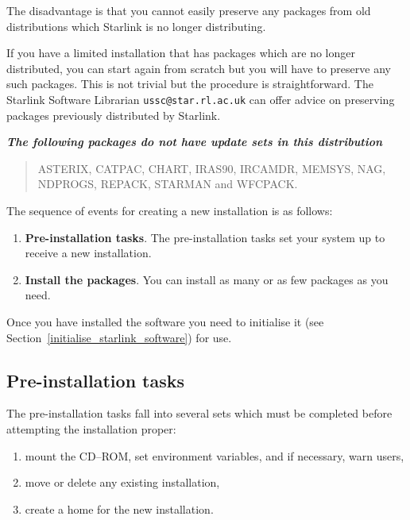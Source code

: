 \documentclass[twoside,11pt]{article}
\newcommand{\htmlref}[2]{#1}
\newcommand{\latex}[1]{#1}
\newcommand{\xlabel}[1]{}
\renewcommand{\_}{\texttt{\symbol{95}}}
\newcommand{\cdrom}{CD--ROM}
\newcommand{\cdrom}{CD-ROM}
\begin{document}
The disadvantage is that you cannot easily preserve any packages from old
distributions which Starlink is no longer distributing.

If you have a limited installation that has packages which are 
no longer distributed, you can start again from scratch but you will
have to preserve any such packages.  This is not trivial but the
procedure is straightforward.
The Starlink Software Librarian \texttt{ussc@star.rl.ac.uk} can offer
advice on preserving packages previously distributed by Starlink.  

\textit{\textbf{The following packages do not have update sets in this
distribution}}

\begin{quote}
ASTERIX, CATPAC, CHART, IRAS90, IRCAMDR, MEMSYS,
NAG, NDPROGS, REPACK, STARMAN and WFCPACK.
\end{quote}

The sequence of events for creating a new installation is as follows:

\begin{enumerate}

\item \textbf{Pre-installation tasks}.  The pre-installation tasks set your
system up to receive a new installation.

\item \textbf{Install the packages}.  You can install as many or as few 
packages as you need.

\end{enumerate}

Once you have installed the software you need to
\htmlref{initialise}{initialise_starlink_software} it \latex{(see
Section~\ref{initialise_starlink_software})} for use.

\subsection{\xlabel{pre-installation_tasks}Pre-installation tasks}
\label{pre-installation_tasks}

The pre-installation tasks fall into several sets which must be completed
before attempting the installation proper:

\begin{enumerate}

\item mount the \cdrom, set environment variables, and if necessary,
warn users,

\item move or delete any existing installation,

\item create a home for the new installation.
\end{enumerate}
\end{document}
